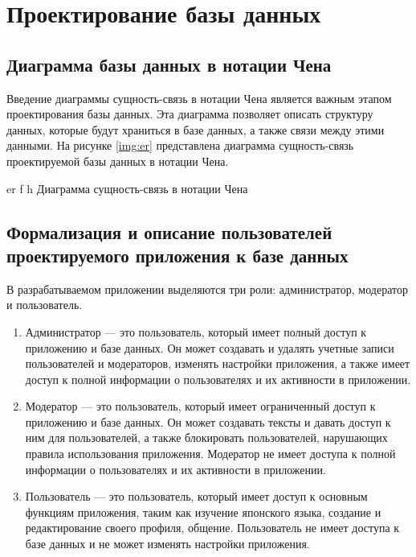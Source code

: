 \section{Проектирование базы данных}

\subsection{Диаграмма базы данных в нотации Чена}

Введение диаграммы сущность-связь в нотации Чена является важным 
этапом проектирования базы данных. Эта диаграмма позволяет 
описать структуру данных, которые будут храниться в базе данных,
а также связи между этими данными.  На рисунке \ref{img:er} представлена диаграмма сущность-связь
проектируемой базы данных в нотации Чена.

\clearpage

  {er}
  {f}
  {h}
  {\linewidth}
  {Диаграмма сущность-связь в нотации Чена}

\subsection{Формализация и описание пользователей проектируемого приложения к базе данных}

В разрабатываемом приложении выделяются три роли: администратор,
модератор и пользователь.

\begin{enumerate}
  \item Администратор --- это пользователь, который имеет полный
    доступ к приложению и базе данных. Он может создавать и 
    удалять учетные записи пользователей и модераторов, 
    изменять настройки приложения, а также имеет доступ к полной 
    информации о пользователях и их активности в приложении.
  \item Модератор --- это пользователь, который имеет ограниченный 
    доступ к приложению и базе данных. Он может создавать тексты и
    давать доступ к ним для пользователей, а также блокировать 
    пользователей, нарушающих правила использования приложения. 
    Модератор не имеет доступа к полной информации о 
    пользователях и их активности в приложении.
  \item Пользователь --- это пользователь, который имеет 
    доступ к основным функциям приложения, таким как изучение 
    японского языка, создание и редактирование своего профиля, 
    общение. Пользователь не имеет доступа к базе данных и не 
    может изменять настройки приложения.
\end{enumerate}

